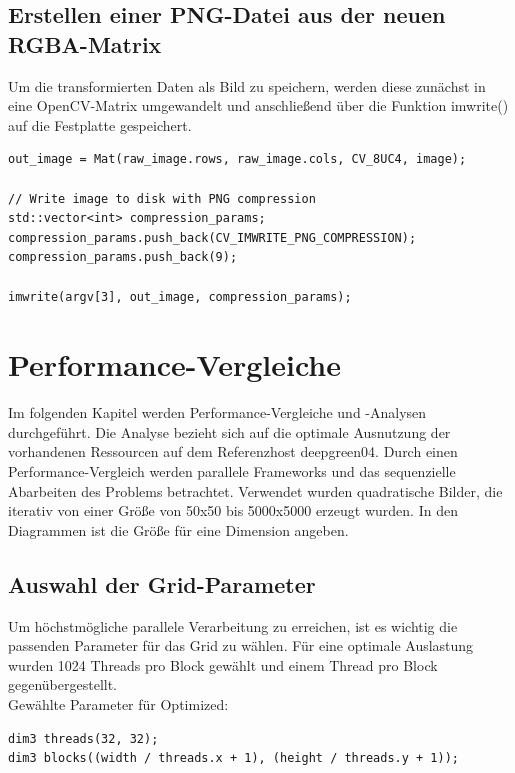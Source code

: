 \documentclass{llncs}
\begin{document}
%
\subsection{Erstellen einer PNG-Datei aus der neuen RGBA-Matrix}
%
Um die transformierten Daten als Bild zu speichern, werden diese zunächst in eine OpenCV-Matrix umgewandelt und anschließend über die Funktion imwrite() auf die Festplatte gespeichert.

\begin{lstlisting}
out_image = Mat(raw_image.rows, raw_image.cols, CV_8UC4, image);

// Write image to disk with PNG compression
std::vector<int> compression_params;
compression_params.push_back(CV_IMWRITE_PNG_COMPRESSION);
compression_params.push_back(9);

imwrite(argv[3], out_image, compression_params);
\end{lstlisting}


%
\section{Performance-Vergleiche}
%

Im folgenden Kapitel werden Performance-Vergleiche und -Analysen durchgeführt. Die Analyse bezieht sich auf die optimale Ausnutzung der vorhandenen Ressourcen auf dem Referenzhost deepgreen04. Durch einen Performance-Vergleich werden parallele Frameworks und das sequenzielle Abarbeiten des Problems betrachtet.  Verwendet wurden quadratische Bilder, die iterativ von einer Größe von 50x50 bis 5000x5000 erzeugt wurden. In den Diagrammen ist die Größe für eine Dimension angeben.
\newpage

%
\subsection{Auswahl der Grid-Parameter}
%

Um höchstmögliche parallele Verarbeitung zu erreichen, ist es wichtig die passenden Parameter für das Grid zu wählen. Für eine optimale Auslastung wurden 1024 Threads pro Block gewählt und einem Thread pro Block gegenübergestellt.\\

Gewählte Parameter für \glqq Optimized\grqq{}:
\begin{lstlisting}
dim3 threads(32, 32);
dim3 blocks((width / threads.x + 1), (height / threads.y + 1));
\end{lstlisting}
\vspace{0.5cm}
\end{document}
